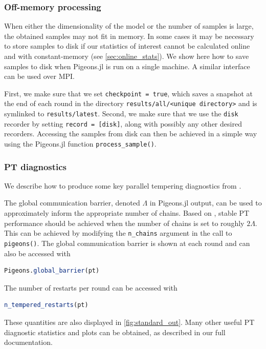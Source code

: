 \subsubsection{Off-memory processing}
When either the dimensionality of the model or the number of samples is large,
the obtained samples may not fit in memory. 
In some cases it may be necessary to store samples to disk if our statistics of 
interest cannot be calculated online and with constant-memory
(see \cref{sec:online_stats}).
We show here how to save samples to disk when Pigeons.jl is run on a single 
machine. A similar interface can be used over MPI. 

 
First, we make sure that we set \texttt{checkpoint = true}, which saves a 
snapshot at the end of each round in the directory \texttt{results/all/<unique directory>}
and is symlinked to \texttt{results/latest}.
Second, we make sure that we use the \texttt{disk} recorder 
by setting \texttt{record = [disk]}, along with possibly any other desired recorders.
Accessing the samples from disk can then be achieved in a simple way using the Pigeons.jl 
function \texttt{process\_sample()}.


\subsubsection{PT diagnostics}
\label{sec:PT_diagnostics}
We describe how to produce some key parallel tempering diagnostics from 
\cite{syed2021nrpt}.

 
The global communication barrier, denoted $\Lambda$ in Pigeons.jl output, can be 
used to approximately inform the appropriate number of chains. 
Based on \cite{syed2021nrpt}, stable PT performance should be achieved when  
the number of chains is set to roughly $2\Lambda$. This can be achieved by 
modifying the \texttt{n\_chains} argument in the call to \texttt{pigeons()}. 
The global communication barrier is shown at each round and can also be accessed 
with 
\begin{lstlisting}[language=Julia]
Pigeons.global_barrier(pt)
\end{lstlisting}

The number of restarts per round can be accessed with 
\begin{lstlisting}[language=Julia]
n_tempered_restarts(pt)
\end{lstlisting}
These quantities are also displayed in \cref{fig:standard_out}. 
Many other useful PT diagnostic statistics and plots can be obtained, as described 
in our full documentation. 


